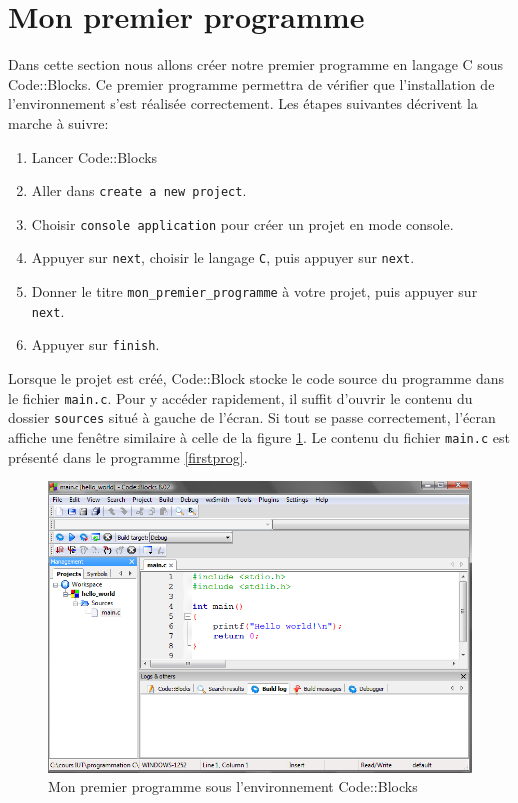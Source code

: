 \documentclass[a4paper,11pt]{book}
\theoremstyle{definition}
\begin{document}
\section{Mon premier programme}\label{corps}

Dans cette section nous allons créer notre premier programme en langage C sous Code::Blocks. Ce premier programme permettra de vérifier que l'installation de l'environnement s'est réalisée correctement. Les étapes suivantes décrivent la marche à suivre:
\begin{enumerate}
\item Lancer Code::Blocks
\item Aller dans \texttt{create a new project}.
\item Choisir \texttt{console application} pour créer un projet en mode console.
\item Appuyer sur \texttt{next}, choisir le langage \texttt{C}, puis appuyer sur \texttt{next}.
\item Donner le titre \texttt{mon\_premier\_programme} à votre projet, puis appuyer sur \texttt{next}.
\item Appuyer sur \texttt{finish}.
\end{enumerate}
Lorsque le projet est créé, Code::Block stocke le code source du programme dans le fichier \texttt{main.c}. Pour y accéder rapidement, il suffit d'ouvrir le contenu du dossier \texttt{sources} situé à gauche de l'écran. Si tout se passe correctement, l'écran affiche une fenêtre similaire à celle de la figure \ref{figcode}. Le contenu du fichier \texttt{main.c} est présenté dans le programme \ref{firstprog}.
\begin{figure}
\centering
\includegraphics[width=0.9\linewidth]{./fig/codeblock.png}
\caption{Mon premier programme sous l'environnement Code::Blocks\label{figcode}}
\end{figure}
\end{document}
